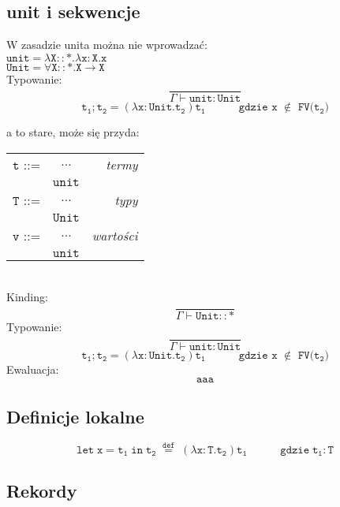 \documentclass[11pt,leqno]{article}
\begin{document}
\subsection{unit i sekwencje}

W zasadzie unita można nie wprowadzać: \\
$\mathtt{unit = \lambda X::\ast.\lambda x:X.x}$ \\
$\mathtt{Unit = \forall X::\ast.X \rightarrow X}$ \\
Typowanie:
 	\[\mathtt{ \frac{}{\Gamma \vdash unit:Unit}
		}
	\]
 	\[\mathtt{ t_1;t_2 = (\lambda x:Unit.t_2)t_1 \hspace{3em} \text{gdzie x $\notin$ FV($t_2$)}
		}
	\]


a to stare, może się przyda: \\

\begin{tabular}{| l c r |}
  \hline
  $\mathtt{t}$ ::= & $\dots$ & \textit{termy}  \\
   & $\mathtt{unit}$ & \\
  $\mathtt{T}$ ::= & $\dots$ & \textit{typy}  \\
   & $\mathtt{Unit}$ & \\
  $\mathtt{v}$ ::= & $\dots$ & \textit{wartości}  \\
   & $\mathtt{unit}$ & \\
  \hline
\end{tabular} \\
Kinding:
 	\[\mathtt{ \frac{}{\Gamma \vdash Unit::\ast}
		}
	\]
Typowanie:
 	\[\mathtt{ \frac{}{\Gamma \vdash unit:Unit}
		}
	\]
 	\[\mathtt{ t_1;t_2 = (\lambda x:Unit.t_2)t_1 \hspace{3em} \text{gdzie x $\notin$ FV($t_2$)}
		}
	\]
Ewaluacja:
 	\[\mathtt{ aaa
		}
	\]

\subsection{Definicje lokalne}

 	\[\mathtt{let\;x=t_1\;in\;t_2 \;\overset{def}{=}\;(\lambda x:T.t_2)t_1 \hspace{3em}\text{gdzie}\; t_1:T 
		}
	\]

\subsection{Rekordy}
\end{document}
